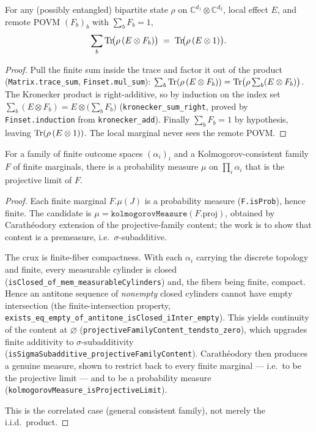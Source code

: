 \begin{theorem}
  \label{thm:no-signaling}
  \leanok
  For any (possibly entangled) bipartite state $\rho$ on
  $\mathbb{C}^{d_1}\otimes\mathbb{C}^{d_2}$, local effect $E$, and remote POVM
  $(F_b)_b$ with $\sum_b F_b = 1$,
  \[
    \sum_b \operatorname{Tr}\!\bigl(\rho\,(E\otimes F_b)\bigr)
    \;=\; \operatorname{Tr}\!\bigl(\rho\,(E\otimes 1)\bigr) .
  \]
\end{theorem}

\begin{proof}
  \leanok
  Pull the finite sum inside the trace and factor it out of the product
  (\texttt{Matrix.trace\_sum}, \texttt{Finset.mul\_sum}):
  $\sum_b \operatorname{Tr}(\rho\,(E\otimes F_b)) = \operatorname{Tr}\bigl(\rho \sum_b (E\otimes F_b)\bigr)$.
  The Kronecker product is right-additive, so by induction on the index set
  $\sum_b (E\otimes F_b) = E \otimes \bigl(\sum_b F_b\bigr)$
  (\texttt{kronecker\_sum\_right}, proved by \texttt{Finset.induction} from
  \texttt{kronecker\_add}). Finally $\sum_b F_b = 1$ by hypothesis, leaving
  $\operatorname{Tr}(\rho\,(E\otimes 1))$. The local marginal never sees the remote POVM.
\end{proof}

\begin{theorem}
  \label{thm:exists-islimit}
  \leanok
  For a family of finite outcome spaces $(\alpha_i)_i$ and a Kolmogorov-consistent
  family $F$ of finite marginals, there is a probability measure $\mu$ on
  $\prod_i \alpha_i$ that is the projective limit of $F$.
\end{theorem}

\begin{proof}
  \leanok
  Each finite marginal $F.\mu(J)$ is a probability measure (\texttt{F.isProb}), hence
  finite. The candidate is $\mu = \texttt{kolmogorovMeasure}(F.\mathrm{proj})$,
  obtained by Carath\'eodory extension of the projective-family content; the work is
  to show that content is a premeasure, i.e.\ $\sigma$-subadditive.

  The crux is finite-fiber compactness. With each $\alpha_i$ carrying the discrete
  topology and finite, every measurable cylinder is closed
  (\texttt{isClosed\_of\_mem\_measurableCylinders}) and, the fibers being finite,
  compact. Hence an antitone sequence of \emph{nonempty} closed cylinders cannot have
  empty intersection (the finite-intersection property,
  \texttt{exists\_eq\_empty\_of\_antitone\_isClosed\_iInter\_empty}). This yields
  continuity of the content at $\varnothing$
  (\texttt{projectiveFamilyContent\_tendsto\_zero}), which upgrades finite additivity
  to $\sigma$-subadditivity
  (\texttt{isSigmaSubadditive\_projectiveFamilyContent}). Carath\'eodory then produces
  a genuine measure, shown to restrict back to every finite marginal --- i.e.\ to be
  the projective limit --- and to be a probability measure
  (\texttt{kolmogorovMeasure\_isProjectiveLimit}).

  This is the correlated case (general consistent family), not merely the i.i.d.\
  product.
\end{proof}

